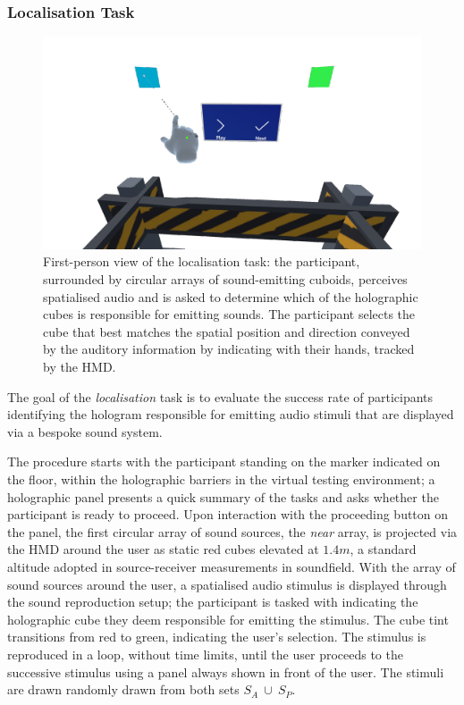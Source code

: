 \subsubsection{Localisation Task}
\begin{figure}[htbp]
    \centering
    \includegraphics[width=1\columnwidth]{7_evaluation/images/localisation-fpv.png}
    \caption{First-person view of the localisation task: the participant, surrounded by circular arrays of sound-emitting cuboids, perceives spatialised audio and is asked to determine which of the holographic cubes is responsible for emitting sounds. The participant selects the cube that best matches the spatial position and direction conveyed by the auditory information by indicating with their hands, tracked by the HMD.}
    \label{fig:localisation-fpv}
\end{figure}
The goal of the \emph{localisation} task is to evaluate the success rate of participants identifying the hologram responsible for emitting audio stimuli that are displayed via a bespoke sound system. \par
The procedure starts with the participant standing on the marker indicated on the floor, within the holographic barriers in the virtual testing environment; a holographic panel presents a quick summary of the tasks and asks whether the participant is ready to proceed. Upon interaction with the proceeding button on the panel, the first circular array of sound sources, the \emph{near} array, is projected via the HMD around the user as static red cubes elevated at $1.4m$, a standard altitude adopted in source-receiver measurements in soundfield. With the array of sound sources around the user, a spatialised audio stimulus is displayed through the sound reproduction setup; the participant is tasked with indicating the holographic cube they deem responsible for emitting the stimulus. The cube tint transitions from red to green, indicating the user's selection. The stimulus is reproduced in a loop, without time limits, until the user proceeds to the successive stimulus using a panel always shown in front of the user. The stimuli are drawn randomly drawn from both sets $S_A~\cup~S_P$. \par
